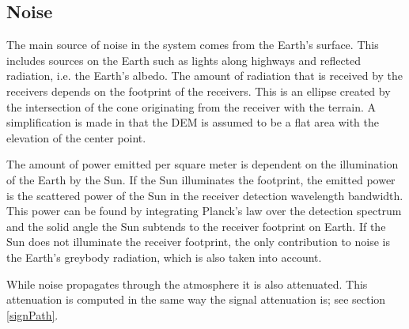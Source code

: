\subsection{Noise}
\label{noise}

The main source of noise in the system comes from the Earth's surface. This includes sources on
the Earth such as lights along highways and reflected radiation, i.e. the Earth's albedo. The amount of
radiation that is received by the receivers depends on the footprint of the  receivers. This is an
ellipse created by the intersection of the cone originating from the receiver with the terrain. A
simplification is made in that the \ac{DEM} is assumed to be a flat area with the elevation of the
center point.
 
The amount of power emitted per square meter is dependent on the illumination of the Earth by the Sun. If the Sun
illuminates the footprint, the emitted power is the scattered power of the Sun in the receiver
detection wavelength bandwidth. This power can be found by integrating Planck's law over the detection spectrum and the solid angle the Sun subtends to the receiver footprint on Earth. If the Sun does not
illuminate the receiver footprint, the only contribution to noise is the Earth's greybody radiation, which is also taken into account.

While noise propagates through the atmosphere it is also attenuated. This attenuation is
computed in the same way the signal attenuation is; see section \ref{signPath}.
